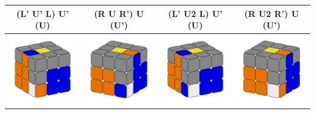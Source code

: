 \documentclass[12pt, a3paper]{article}
\newcommand{\scale}{1}
\begin{document}
\begin{center}
\begin{longtable}{c|c||c|c}
	(L' U' L) U' (U) & (R U R') U (U') & (L' U2 L) U' (U) & (R U2 R') U (U') \\
	\hline
	\hline
	\includegraphics[scale=\scale]{15l} & \includegraphics[scale=\scale]{15r}  &  \includegraphics[scale=\scale]{16l} & \includegraphics[scale=\scale]{16r} \\

\end{longtable}
\end{center}
\end{document}
